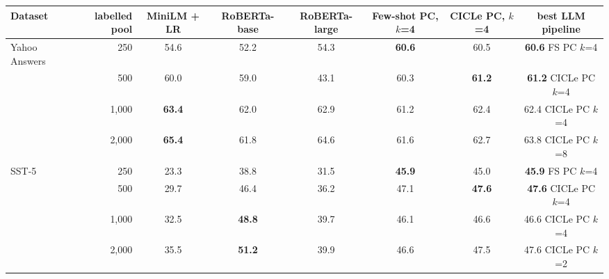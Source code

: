 \begin{tabular}{lrcccccc}
\toprule
Dataset & labelled pool & MiniLM + LR & RoBERTa-base & RoBERTa-large & Few-shot PC, $k$=4 & CICLe PC, $k$=4 & best LLM pipeline \\
\midrule
Yahoo Answers & 250 & 54.6 & 52.2 & 54.3 & \textbf{60.6} & 60.5 & \textbf{60.6} {\scriptsize FS PC $k$=4} \\
 & 500 & 60.0 & 59.0 & 43.1 & 60.3 & \textbf{61.2} & \textbf{61.2} {\scriptsize CICLe PC $k$=4} \\
 & 1,000 & \textbf{63.4} & 62.0 & 62.9 & 61.2 & 62.4 & 62.4 {\scriptsize CICLe PC $k$=4} \\
 & 2,000 & \textbf{65.4} & 61.8 & 64.6 & 61.6 & 62.7 & 63.8 {\scriptsize CICLe PC $k$=8} \\
\midrule
SST-5 & 250 & 23.3 & 38.8 & 31.5 & \textbf{45.9} & 45.0 & \textbf{45.9} {\scriptsize FS PC $k$=4} \\
 & 500 & 29.7 & 46.4 & 36.2 & 47.1 & \textbf{47.6} & \textbf{47.6} {\scriptsize CICLe PC $k$=4} \\
 & 1,000 & 32.5 & \textbf{48.8} & 39.7 & 46.1 & 46.6 & 46.6 {\scriptsize CICLe PC $k$=4} \\
 & 2,000 & 35.5 & \textbf{51.2} & 39.9 & 46.6 & 47.5 & 47.6 {\scriptsize CICLe PC $k$=2} \\
\bottomrule
\end{tabular}
